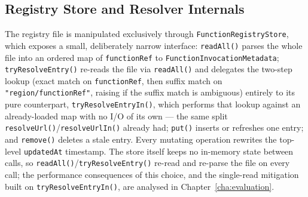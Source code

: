 \subsection{Registry Store and Resolver Internals}
\label{subsec:store-internals}

The registry file is manipulated exclusively through \texttt{FunctionRegistryStore}, which
exposes a small, deliberately narrow interface: \texttt{readAll()} parses the whole file into an
ordered map of \texttt{functionRef} to \texttt{FunctionInvocationMetadata}; \texttt{tryResolveEntry()}
re-reads the file via \texttt{readAll()} and delegates the two-step lookup (exact match on
\texttt{functionRef}, then suffix match on \texttt{"region/functionRef"}, raising if the suffix
match is ambiguous) entirely to its pure counterpart, \texttt{tryResolveEntryIn()}, which performs
that lookup against an already-loaded map with no I/O of its own --- the same split
\texttt{resolveUrl()}/\texttt{resolveUrlIn()} already had; \texttt{put()} inserts or refreshes one entry; and
\texttt{remove()} deletes a stale entry. Every mutating operation rewrites the top-level
\texttt{updatedAt} timestamp. The store itself keeps no in-memory state between calls, so
\texttt{readAll()}/\texttt{tryResolveEntry()} re-read and re-parse the file on every call; the
performance consequences of this choice, and the single-read mitigation built on
\texttt{tryResolveEntryIn()}, are analysed in Chapter~\ref{cha:evaluation}.

